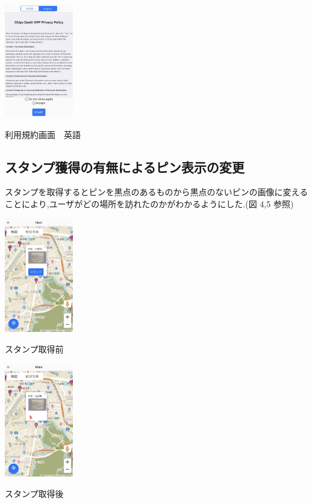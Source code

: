 \documentclass[a4paper, twoside]{jarticle}
\makeatletter
\newenvironment{figurehere}
  {\def\@captype{figure}}
  {}
\makeatother
\begin{document}
\begin{multicols}{2}
\begin{figurehere}
\begin{center}
\includegraphics[bb=30 50 550 1300,width=3cm]{./image03.jpg}%
\end{center}
\caption{利用規約画面　英語}\label{fig:3}
\end{figurehere}


\subsection{スタンプ獲得の有無によるピン表示の変更}
スタンプを取得するとピンを黒点のあるものから黒点のないピンの画像に変えることにより,ユーザがどの場所を訪れたのかがわかるようにした.(図 4,5 参照)
\begin{figurehere}
\begin{center}
\includegraphics[bb=30 50 550 1300,width=3cm]{./image05.jpg}%
\end{center}
\caption{スタンプ取得前}\label{fig:5}

\begin{center}
\includegraphics[bb=30 50 550 1300,width=3cm]{./image06.jpg}%
\end{center}
\caption{スタンプ取得後}\label{fig:6}
\end{figurehere}


\end{multicols}
\end{document}
